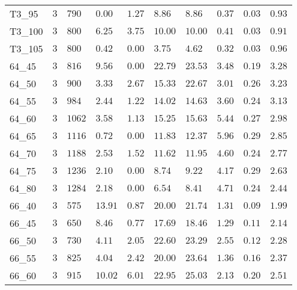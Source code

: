 \begin{center}
\begin{table}[]
\begin{adjustwidth}{-0.4in}{-1in}
\begin{tabular}{|lll|l|l|ll|lll|}
T3\_95   & $3$    & $790$  & $\bm{0.00}$   & $1.27$     & $8.86$       & $8.86 $     & $0.37$   & $0.03$     & $0.93$      \\
T3\_100  & $3$    & $800$  & $6.25$   & $3.75$     & $10.00$      & $10.00$     & $0.41$   & $0.03$     & $0.91$      \\
T3\_105  & $3$    & $800$  & $0.42$   & $\bm{0.00}$     & $3.75$       & $4.62 $     & $0.32$   & $0.03$     & $0.96$      \\
\hline
64\_45   & $3$    & $816 $ & $9.56$   & $\bm{0.00}$     & $22.79$      & $23.53$     & $3.48$   & $0.19$     & $3.28$      \\
64\_50   & $3$    & $900 $ & $3.33$   & $2.67$     & $15.33$      & $22.67$     & $3.01$   & $0.26$     & $3.23$      \\
64\_55   & $3$    & $984 $ & $2.44$   & $1.22$     & $14.02$      & $14.63$     & $3.60$   & $0.24$     & $3.13$      \\
64\_60   & $3$    & $1062$ & $3.58$   & $1.13$     & $15.25$      & $15.63$     & $5.44$   & $0.27$     & $2.98$      \\
64\_65   & $3$    & $1116$ & $0.72$   & $\bm{0.00}$     & $11.83$      & $12.37$     & $5.96$   & $0.29$     & $2.85$      \\
64\_70   & $3$    & $1188$ & $2.53$   & $1.52$     & $11.62$      & $11.95$     & $4.60$   & $0.24$     & $2.77$      \\
64\_75   & $3$    & $1236$ & $2.10$   & $\bm{0.00}$     & $8.74 $      & $9.22 $     & $4.17$   & $0.29$     & $2.63$      \\
64\_80   & $3$    & $1284$ & $2.18$   & $\bm{0.00}$     & $6.54 $      & $8.41 $     & $4.71$   & $0.24$     & $2.44$      \\
\hline
66\_40   & $3$    & $575 $ & $13.91$  & $0.87$     & $20.00$      & $21.74$     & $1.31$   & $0.09$     & $1.99$      \\
66\_45   & $3$    & $650 $ & $8.46 $  & $0.77$     & $17.69$      & $18.46$     & $1.29$   & $0.11$     & $2.14$      \\
66\_50   & $3$    & $730 $ & $4.11 $  & $2.05$     & $22.60$      & $23.29$     & $2.55$   & $0.12$     & $2.28$      \\
66\_55   & $3$    & $825 $ & $4.04 $  & $2.42$     & $20.00$      & $23.64$     & $1.36$   & $0.16$     & $2.37$      \\
66\_60   & $3$    & $915 $ & $10.02$  & $6.01$     & $22.95$      & $25.03$     & $2.13$   & $0.20$     & $2.51$      \\

\end{tabular}
\end{adjustwidth}
\end{table}
\end{center}
